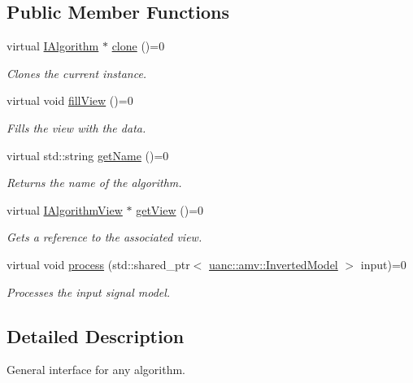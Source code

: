 \subsection*{Public Member Functions}
\begin{DoxyCompactItemize}
\item 
virtual \hyperlink{classuanc_1_1amv_1_1_i_algorithm}{I\+Algorithm} $\ast$ \hyperlink{classuanc_1_1amv_1_1_i_algorithm_af6fcbfa35f460363c2cc7e6134af8dc7}{clone} ()=0
\begin{DoxyCompactList}\small\item\em Clones the current instance. \end{DoxyCompactList}\item 
virtual void \hyperlink{classuanc_1_1amv_1_1_i_algorithm_a6f71d353db186306f5d4e191f0c15cc4}{fill\+View} ()=0
\begin{DoxyCompactList}\small\item\em Fills the view with the data. \end{DoxyCompactList}\item 
virtual std\+::string \hyperlink{classuanc_1_1amv_1_1_i_algorithm_a4935ab2fdacccf7df35d6fb596075edb}{get\+Name} ()=0
\begin{DoxyCompactList}\small\item\em Returns the name of the algorithm. \end{DoxyCompactList}\item 
virtual \hyperlink{classuanc_1_1amv_1_1_i_algorithm_view}{I\+Algorithm\+View} $\ast$ \hyperlink{classuanc_1_1amv_1_1_i_algorithm_ab1806c419a1e73adc149b7fb187d23d7}{get\+View} ()=0
\begin{DoxyCompactList}\small\item\em Gets a reference to the associated view. \end{DoxyCompactList}\item 
virtual void \hyperlink{classuanc_1_1amv_1_1_i_algorithm_a14dd1e42a421c48b8874e42933daa0b9}{process} (std\+::shared\+\_\+ptr$<$ \hyperlink{classuanc_1_1amv_1_1_inverted_model}{uanc\+::amv\+::\+Inverted\+Model} $>$ input)=0
\begin{DoxyCompactList}\small\item\em Processes the input signal model. \end{DoxyCompactList}\end{DoxyCompactItemize}


\subsection{Detailed Description}
General interface for any algorithm. 

